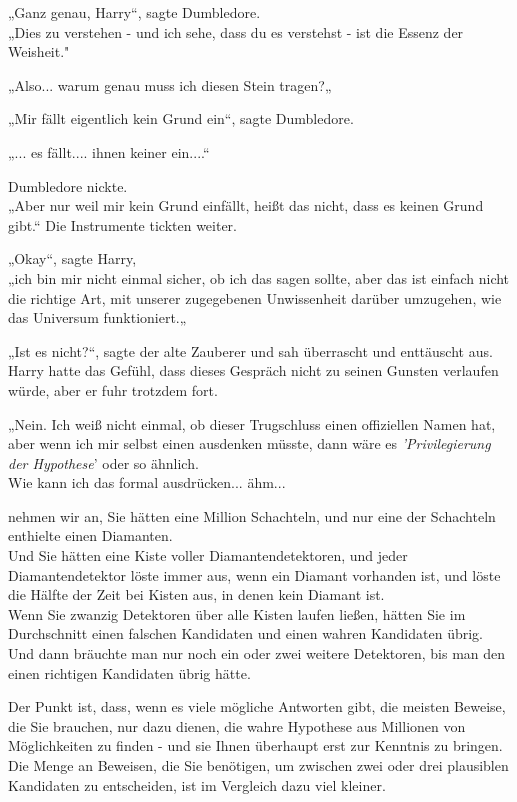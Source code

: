 {„Ganz genau, Harry“, sagte Dumbledore.\\ „Dies zu verstehen - und ich sehe, dass du es verstehst - ist die Essenz der Weisheit."

„Also... warum genau muss ich diesen Stein tragen?„

„Mir fällt eigentlich kein Grund ein“, sagte Dumbledore.

„... es fällt.... ihnen keiner ein....“

Dumbledore nickte.\\ „Aber nur weil mir kein Grund einfällt, heißt das nicht, dass es keinen Grund gibt.“ Die Instrumente tickten weiter.

„Okay“, sagte Harry,\\ „ich bin mir nicht einmal sicher, ob ich das sagen sollte, aber das ist einfach nicht die richtige Art, mit unserer zugegebenen Unwissenheit darüber umzugehen, wie das Universum funktioniert.„

„Ist es nicht?“, sagte der alte Zauberer und sah überrascht und enttäuscht aus.\\ Harry hatte das Gefühl, dass dieses Gespräch nicht zu seinen Gunsten verlaufen würde, aber er fuhr trotzdem fort.

„Nein. Ich weiß nicht einmal, ob dieser Trugschluss einen offiziellen Namen hat, aber wenn ich mir selbst einen ausdenken müsste, dann wäre es \emph{'Privilegierung der Hypothese}' oder so ähnlich.\\ Wie kann ich das formal ausdrücken... ähm...

nehmen wir an, Sie hätten eine Million Schachteln, und nur eine der Schachteln enthielte einen Diamanten.\\ Und Sie hätten eine Kiste voller Diamantendetektoren, und jeder Diamantendetektor löste immer aus, wenn ein Diamant vorhanden ist, und löste die Hälfte der Zeit bei Kisten aus, in denen kein Diamant ist.\\ Wenn Sie zwanzig Detektoren über alle Kisten laufen ließen, hätten Sie im Durchschnitt einen falschen Kandidaten und einen wahren Kandidaten übrig.\\ Und dann bräuchte man nur noch ein oder zwei weitere Detektoren, bis man den einen richtigen Kandidaten übrig hätte.

Der Punkt ist, dass, wenn es viele mögliche Antworten gibt, die meisten Beweise, die Sie brauchen, nur dazu dienen, die wahre Hypothese aus Millionen von Möglichkeiten zu finden - und sie Ihnen überhaupt erst zur Kenntnis zu bringen.\\ Die Menge an Beweisen, die Sie benötigen, um zwischen zwei oder drei plausiblen Kandidaten zu entscheiden, ist im Vergleich dazu viel kleiner.

}
